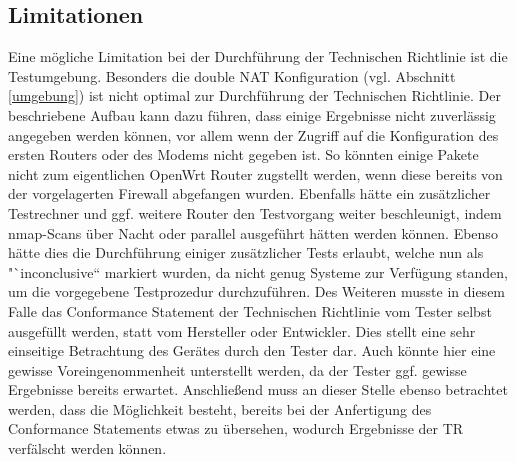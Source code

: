 \documentclass[a4paper]{book}
\begin{document}
\begin{large}
\section{Limitationen}
\label{limits}
\begin{onehalfspace}
Eine mögliche Limitation bei der Durchführung der Technischen Richtlinie ist die Testumgebung. Besonders die double NAT Konfiguration (vgl. Abschnitt \ref{umgebung})  ist nicht optimal zur Durchführung der Technischen Richtlinie. Der beschriebene Aufbau kann dazu führen, dass einige Ergebnisse nicht zuverlässig angegeben werden können, vor allem wenn der Zugriff auf die Konfiguration des ersten Routers oder des Modems nicht gegeben ist. So könnten einige Pakete nicht zum eigentlichen OpenWrt Router zugstellt werden, wenn diese bereits von der vorgelagerten Firewall abgefangen wurden. Ebenfalls hätte ein zusätzlicher Testrechner und ggf. weitere Router den Testvorgang weiter beschleunigt, indem nmap-Scans über Nacht oder parallel ausgeführt hätten werden können. Ebenso hätte dies die Durchführung einiger zusätzlicher Tests erlaubt, welche nun als "`inconclusive“ markiert wurden, da nicht genug Systeme zur Verfügung standen, um die vorgegebene Testprozedur durchzuführen. Des Weiteren musste in diesem Falle das \glqq Conformance Statement\grqq{} der Technischen Richtlinie vom Tester selbst ausgefüllt werden, statt vom Hersteller oder Entwickler. Dies stellt eine sehr einseitige Betrachtung des Gerätes durch den Tester dar. Auch könnte hier eine gewisse Voreingenommenheit unterstellt werden, da der Tester ggf. gewisse Ergebnisse bereits erwartet. Anschließend muss an dieser Stelle ebenso betrachtet werden, dass die Möglichkeit besteht, bereits bei der Anfertigung des \glqq Conformance Statements\grqq{} etwas zu übersehen, wodurch Ergebnisse der TR verfälscht werden können. \\ \indent

\end{onehalfspace}
\end{large}
\end{document}
